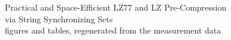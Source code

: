 \documentclass[letterpaper,10pt,twocolumn]{article}
\begin{document}
\begin{center}
\Large Practical and Space-Efficient LZ77 and LZ Pre-Compression\\
via String Synchronizing Sets\\[4pt]
\normalsize figures and tables, regenerated from the measurement data
\end{center}

\setcounter{table}{1}


\setcounter{figure}{2}
\begin{figure}[t]

\end{figure}

\begin{figure}[t]

\end{figure}
\end{document}
